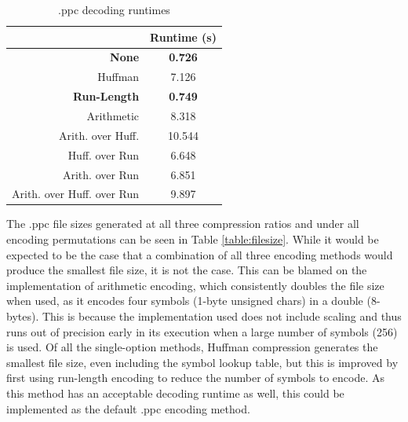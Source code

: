 \documentclass[10pt,twocolumn,twoside]{IEEEtran}
\begin{document}
\begin{table}[htdp]
\caption{.ppc decoding runtimes}
\vskip -15pt
\label{table:decode_times}
\small{
\begin{center}
\begin{tabular}{|r|c|}
\hline
 & Runtime (s) \\
 \hline
 \textbf{None} & \textbf{0.726}\\
 \hline
 Huffman & 7.126\\
 \hline
 \textbf{Run-Length} & \textbf{0.749}\\
 \hline
 Arithmetic & 8.318\\
 \hline
 Arith. over Huff. & 10.544\\
 \hline
 Huff. over Run & 6.648\\
 \hline
 Arith. over Run & 6.851\\
 \hline
 Arith. over Huff. over Run & 9.897\\
 \hline
\end{tabular}
\end{center}
}
\end{table}

The .ppc file sizes generated at all three compression ratios and under all encoding permutations can be seen in Table \ref{table:filesize}. While it would be expected to be the case that a combination of all three encoding methods would produce the smallest file size, it is not the case. This can be blamed on the implementation of arithmetic encoding, which consistently doubles the file size when used, as it encodes four symbols (1-byte unsigned chars) in a double (8-bytes). This is because the implementation used does not include scaling and thus runs out of precision early in its execution when a large number of symbols (256) is used. Of all the single-option methods, Huffman compression generates the smallest file size, even including the symbol lookup table, but this is improved by first using run-length encoding to reduce the number of symbols to encode. As this method has an acceptable decoding runtime as well, this could be implemented as the default .ppc encoding method.
\end{document}
